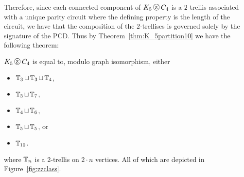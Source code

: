 Therefore, since each connected component of $K_5 \zigzag C_4$ is a $2$-trellis associated with a unique parity circuit where the defining property is the length of the circuit, we have that the composition of the $2$-trellises is governed solely by the signature of the PCD. Thus by Theorem~\ref{thm:K_5partition10} we have the following theorem: 

\newpage
\begin{theorem}
  \label{thm:zigzag_cats}
$K_5 \zigzag C_4$ is equal to, modulo graph isomorphism,  either
\begin{itemize}
\item $\operatorname{\mathbb{T}}_3 \sqcup \operatorname{\mathbb{T}}_3 \sqcup \operatorname{\mathbb{T}}_4$,
\item $\operatorname{\mathbb{T}}_3 \sqcup \operatorname{\mathbb{T}}_7$,
\item $\operatorname{\mathbb{T}}_4 \sqcup \operatorname{\mathbb{T}}_6$,
\item $\operatorname{\mathbb{T}}_5 \sqcup \operatorname{\mathbb{T}}_5$, or
\item $\operatorname{\mathbb{T}}_{10}$.
\end{itemize}

\noindent
where $\operatorname{\mathbb{T}}_n$ is a $2$-trellis on $2\cdot n$ vertices. All of which are depicted in Figure~\ref{fig:zzclass}. 
\end{theorem}

